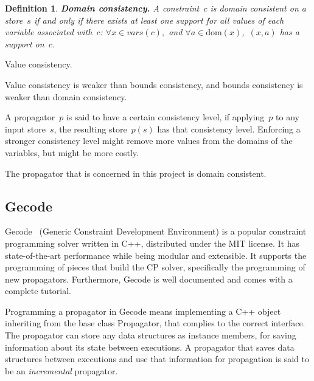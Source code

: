 \documentclass[a4paper,11pt]{article}
\newtheorem{definition}{Definition}
\newcommand{\Todo}[1]{{\color{blue}#1}}
\newcommand{\Dom}[1]{\text{dom}({#1})}
\numberwithin{equation}{section}
\begin{document}
\begin{definition}
  \textbf{Domain consistency.} A constraint~$c$ is domain consistent on a store~$s$ 
  if and only if there exists at least one support for all values of each variable
  associated with~$c$:
  $\forall x \in vars(c),$ and $\forall a \in \Dom{x}$,~$(x,a)$ 
  has a support on~$c$.
\end{definition}

\Todo{Value consistency}.

Value consistency is weaker than bounds consistency, and bounds consistency
is weaker than domain consistency.

A propagator~$p$ is said to have a certain consistency level,
if applying~$p$ to any input store~$s$, the resulting store~$p(s)$
has that consistency level. Enforcing a stronger consistency level might 
remove more values from the domains of the variables, but might be
more costly.

The propagator that is concerned in this project is domain consistent.

\subsection{Gecode}
\label{bg:gecode}
Gecode~\cite{Gecode} (Generic Constraint Development Environment)
is a popular constraint programming solver written in C++,
distributed under the MIT license.
It has state-of-the-art performance while being modular and extensible.
It supports the programming of pieces that build the CP solver,
specifically the programming of new propagators.
Furthermore, Gecode is well documented and comes
with a complete tutorial.

Programming a propagator in Gecode means implementing a C++ object
inheriting from the base class Propagator,
that complies to the correct interface.
The propagator can store any data structures as instance members,
for saving information about its state between executions.
A propagator that saves data structures between executions
and use that information for propagation is
said to be an \emph{incremental} propagator.

    
\end{document}
